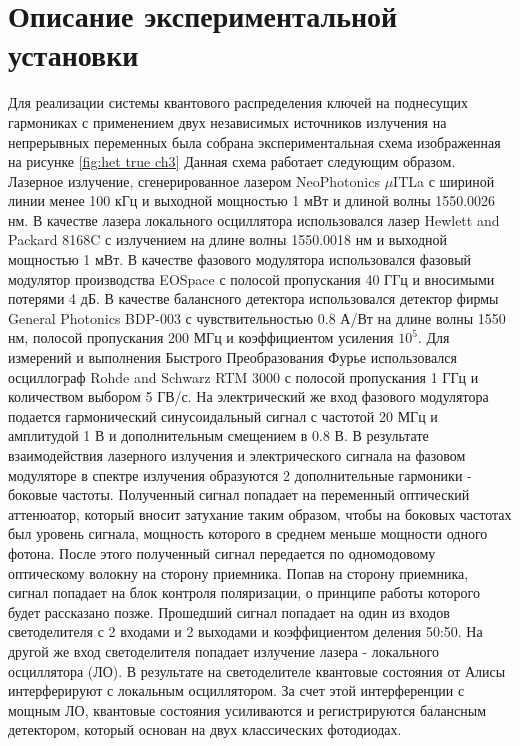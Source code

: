 \section{Описание экспериментальной установки}\label{sec:ch3/sect7}
Для реализации системы квантового распределения ключей на поднесущих гармониках с применением двух независимых источников излучения на непрерывных переменных была собрана экспериментальная схема изображенная на рисунке \ref*{fig:het true ch3}
Данная схема работает следующим образом. Лазерное излучение, сгенерированное лазером NeoPhotonics $\mu$ITLa с шириной линии менее 100 кГц и выходной мощностью 1 мВт и длиной волны 1550.0026 нм. В качестве лазера локального осциллятора использовался лазер Hewlett and Packard 8168C с излучением на длине волны 1550.0018 нм и выходной мощностью 1 мВт. В качестве фазового модулятора использовался фазовый модулятор производства EOSpace с полосой пропускания 40 ГГц и вносимыми потерями 4 дБ.
В качестве балансного детектора использовался детектор фирмы General Photonics BDP-003 с чувствительностью 0.8 А/Вт на длине волны 1550 нм, полосой пропускания 200 МГц и коэффициентом усиления ${10^5}$.
Для измерений и выполнения Быстрого Преобразования Фурье использовался осциллограф Rohde and Schwarz RTM 3000 с полосой пропускания 1 ГГц и количеством выбором 5 ГВ/с.
На электрический же вход фазового модулятора подается гармонический синусоидальный сигнал с частотой 20 МГц и амплитудой 1 В и дополнительным смещением в 0.8 В. В результате взаимодействия лазерного излучения и электрического сигнала на фазовом модуляторе в спектре излучения образуются 2 дополнительные гармоники - боковые частоты.
Полученный сигнал попадает на переменный оптический аттенюатор, который вносит затухание таким образом, чтобы на боковых частотах был уровень сигнала, мощность которого в среднем меньше мощности одного фотона.
После этого полученный сигнал передается по одномодовому оптическому волокну на сторону приемника. Попав на сторону приемника, сигнал попадает на блок контроля поляризации, о принципе работы которого будет рассказано позже. Прошедший сигнал попадает на один из входов светоделителя с 2 входами и 2 выходами и коэффициентом деления 50:50.
На другой же вход светоделителя попадает излучение лазера - локального осциллятора (ЛО). В результате на светоделителе квантовые состояния от Алисы интерферируют с локальным осциллятором. За счет этой интерференции с мощным ЛО, квантовые состояния усиливаются и регистрируются балансным детектором, который основан на двух классических фотодиодах.

